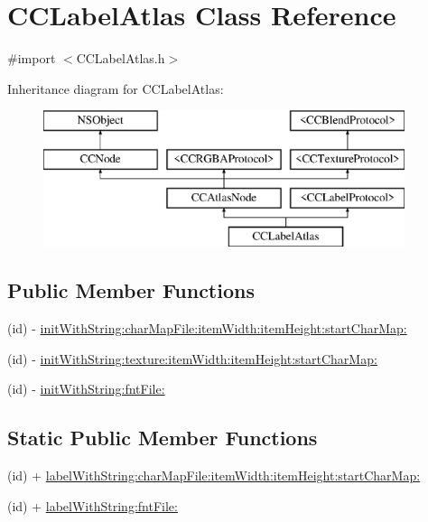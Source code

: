 \hypertarget{interface_c_c_label_atlas}{\section{C\-C\-Label\-Atlas Class Reference}
\label{interface_c_c_label_atlas}
}


{\ttfamily \#import $<$C\-C\-Label\-Atlas.\-h$>$}

Inheritance diagram for C\-C\-Label\-Atlas\-:\begin{figure}[H]
\begin{center}
\leavevmode
\includegraphics[height=4.000000cm]{interface_c_c_label_atlas}
\end{center}
\end{figure}
\subsection*{Public Member Functions}
\begin{DoxyCompactItemize}
\item 
(id) -\/ \hyperlink{interface_c_c_label_atlas_a19dcf62a3873d49544c7369bb18395f3}{init\-With\-String\-:char\-Map\-File\-:item\-Width\-:item\-Height\-:start\-Char\-Map\-:}
\item 
(id) -\/ \hyperlink{interface_c_c_label_atlas_a68ba5e253c49551bef417d07870e9d3b}{init\-With\-String\-:texture\-:item\-Width\-:item\-Height\-:start\-Char\-Map\-:}
\item 
(id) -\/ \hyperlink{interface_c_c_label_atlas_a5993cb1943612efab6eb037e8a377856}{init\-With\-String\-:fnt\-File\-:}
\end{DoxyCompactItemize}
\subsection*{Static Public Member Functions}
\begin{DoxyCompactItemize}
\item 
(id) + \hyperlink{interface_c_c_label_atlas_ad3670884b30f800338858d9444cc1340}{label\-With\-String\-:char\-Map\-File\-:item\-Width\-:item\-Height\-:start\-Char\-Map\-:}
\item 
(id) + \hyperlink{interface_c_c_label_atlas_a0cfc0dfa7f377aeebc987d3010834725}{label\-With\-String\-:fnt\-File\-:}
\end{DoxyCompactItemize}
